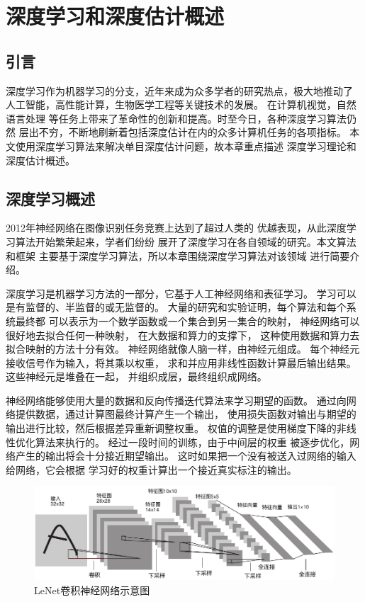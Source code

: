 \chapter{深度学习和深度估计概述}
\section{引言}
深度学习作为机器学习的分支，近年来成为众多学者的研究热点，极大地推动了
人工智能，高性能计算，生物医学工程等关键技术的发展。
在计算机视觉，自然语言处理
等任务上带来了革命性的创新和提高。时至今日，各种深度学习算法仍然
层出不穷，不断地刷新着包括深度估计在内的众多计算机任务的各项指标。
本文使用深度学习算法来解决单目深度估计问题，故本章重点描述
深度学习理论和深度估计概述。
\section{深度学习概述}
2012年神经网络在图像识别任务竞赛上达到了超过人类的
优越表现，从此深度学习算法开始繁荣起来，学者们纷纷
展开了深度学习在各自领域的研究。本文算法和框架
主要基于深度学习算法，所以本章围绕深度学习算法对该领域
进行简要介绍。

深度学习是机器学习方法的一部分，它基于人工神经网络和表征学习。
学习可以是有监督的、半监督的或无监督的。
大量的研究和实验证明，每个算法和每个系统最终都
可以表示为一个数学函数或一个集合到另一集合的映射，
神经网络可以很好地去拟合任何一种映射，
在大数据和算力的支撑下，
这种使用数据和算力去拟合映射的方法十分有效。
神经网络就像人脑一样，由神经元组成。
每个神经元接收信号作为输入，将其乘以权重，
求和并应用非线性函数计算最后输出结果。这些神经元是堆叠在一起，
并组织成层，最终组织成网络。

神经网络能够使用大量的数据和反向传播迭代算法来学习期望的函数。
通过向网络提供数据，通过计算图最终计算产生一个输出，
使用损失函数对输出与期望的输出进行比较，然后根据差异重新调整权重。
权值的调整是使用梯度下降的非线性优化算法来执行的。
经过一段时间的训练，由于中间层的权重
被逐步优化，网络产生的输出将会十分接近期望输出。
这时如果把一个没有被送入过网络的输入给网络，它会根据
学习好的权重计算出一个接近真实标注的输出。
\begin{figure}
    \centering
    \includegraphics[scale=0.9]{figure/Lenet.pdf}
    \caption{LeNet\cite{lenet}卷积神经网络示意图}
    \label{lenet}
\end{figure}

